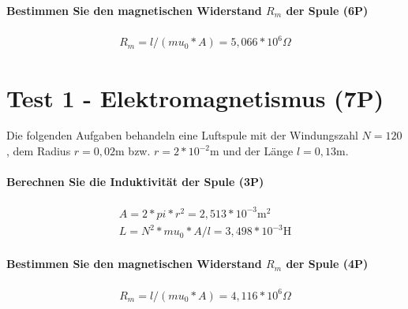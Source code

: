 \documentclass{article}
\begin{document}
\subsection*{Bestimmen Sie den magnetischen Widerstand $R_{m}$ der Spule (6P)}


\begin{gather}
R_{m}=l / (mu_0 * A)=5{,}066*10^{6}\Omega
\end{gather}



\part*{Test 1 - Elektromagnetismus (7P)}

Die folgenden Aufgaben behandeln eine Luftspule mit der Windungszahl $N=120$, dem Radius $r=0{,}02$m bzw. $r=2*10^{ -2 }$m und der Länge $l=0{,}13$m.

\subsection*{Berechnen Sie die Induktivität der Spule (3P)}


\begin{gather}
A=2 * pi * r ^ 2=2{,}513*10^{-3}\text{m}^2 \\
L=N ^ 2 * mu_0 * A / l=3{,}498*10^{-3}\text{H}
\end{gather}

\subsection*{Bestimmen Sie den magnetischen Widerstand $R_{m}$ der Spule (4P)}


\begin{gather}
R_{m}=l / (mu_0 * A)=4{,}116*10^{6}\Omega
\end{gather}
\end{document}
